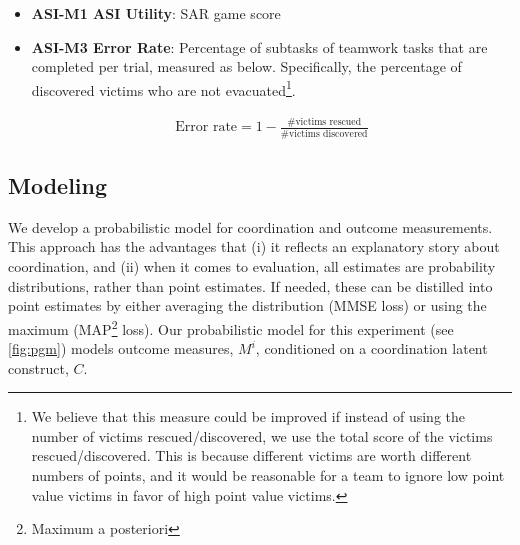 \begin{itemize}

    \item \textbf{ASI-M1 ASI Utility}: SAR game score

    \item \textbf{ASI-M3 Error Rate}: Percentage of subtasks of teamwork tasks
        that are completed per trial, measured as below.  Specifically, the
        percentage of discovered victims who are not evacuated\footnote{We
            believe that this measure could be improved if instead of using the
            number of victims rescued/discovered, we use the total score of the
            victims rescued/discovered. This is because different victims are
            worth different numbers of points, and it would be reasonable for a
            team to ignore low point value victims in favor of high point value
        victims.}.

        \begin{align}
            \text{Error rate} = 1 - \frac{\text{\# victims rescued}}{\text{\# victims discovered}}
        \end{align}

\end{itemize}

\subsection{Modeling}
\label{subsec:modeling}

    We develop a probabilistic model for coordination and outcome measurements.
    This approach has the advantages that (i) it reflects an explanatory story
    about coordination, and (ii) when it comes to evaluation, all estimates are
    probability distributions, rather than point estimates.  If needed, these
    can be distilled into point estimates by either averaging the distribution
    (MMSE loss) or using the maximum (MAP\footnote{Maximum a posteriori} loss).
    Our probabilistic model for this experiment (see \autoref{fig:pgm}) models
    outcome measures, $M^i$, conditioned on a coordination latent construct,
    $C$.

